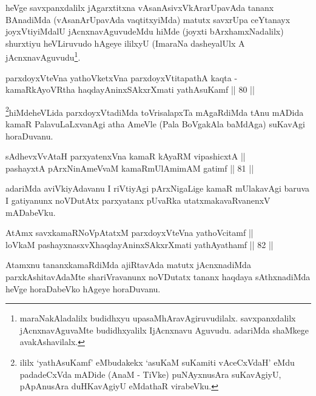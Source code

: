 \begin{artha}
heVge savxpanxdalilx jAgarxtitxna vAsanAsivxVkArarUpavAda tananx
BAnadiMda (vAsanArUpavAda vaqtitxyiMda) matutx savxrUpa ceYtanayx
joyxVtiyiMdalU jAcnxnavAguvudeMdu hiMde (joyxti bArxhamxNadalilx)
shurxtiyu heVLiruvudo hAgeye ililxyU (ImaraNa dasheyalUlx A
jAcnxnavAguvudu\footnote{maraNakAladalilx budidhxyu
upasaMhAravAgiruvudilalx. savxpanxdalilx jAcnxnavAguvaMte
budidhxyalilx IjAcnxnavu Aguvudu. adariMda shaMkege avakAshavilalx.}.
\end{artha}


\begin{shl}
parxdoyxVteVna yathoVketxVna parxdoyxVtitapathA kaqta -\\
kamaRkAyoVR\s tha haqdayAninxSAkxrXmati yathAsuKamf \hfill || 80 ||  
\end{shl}

\begin{artha}
\footnote{ililx `yathAsuKamf' eMbudakekx `asuKaM suKamiti vAceCxVdaH'
eMdu padadeCxVda mADide (AnaM - TiVke) puNAyxnusAra suKavAgiyU,
pApAnusAra duHKavAgiyU eMdathaR virabeVku.}hiMdeheVLida parxdoyxVtadiMda toVrisalapxTa mAgaRdiMda tAnu
mADida kamaR PalavuLaLxvanAgi atha AmeVle (Pala BoVgakAla baMdAga)
suKavAgi horaDuvanu.
\end{artha}

\begin{shl}
sAdhevxVvAtaH parxyatenxVna kamaR kAyaRM vipashicxtA || \\
pashayxtA pArxNinAmeVvaM kamaRmUlAmimAM gatimf \hfill || 81 ||  
\end{shl}

\begin{artha}
adariMda aviVkiyAdavanu I riVtiyAgi pArxNigaLige kamaR mUlakavAgi
baruva I gatiyanunx noVDutAtx parxyatanx pUvaRka utatxmakavaRvanenxV
mADabeVku.
\end{artha}

\begin{shl}
AtAmx savxkamaRNoVpAtatxM parxdoyxVteVna yathoVcitamf || \\
loVkaM pashayxnasxvXhaqdayAninxSAkxrXmati yathAyathamf \hfill || 82 ||  
\end{shl}

\begin{artha}
Atamxnu tananxkamaRdiMda ajiRtavAda matutx jAcnxnadiMda
parxkAshitavAdaMte shariVravanunx noVDutatx tananx haqdaya
sAthxnadiMda heVge horaDabeVko hAgeye horaDuvanu.
\end{artha}

